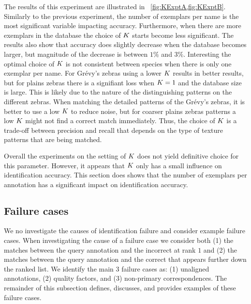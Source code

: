         The results of this experiment are illustrated in ~\cref{fig:KExptA,fig:KExptB}. Similarly to the previous
        experiment, the number of exemplars per name is the most significant variable impacting accuracy.
        Furthermore, when there are more exemplars in the database the choice of $K$ starts become less
        significant. The results also show that accuracy does slightly decrease when the database becomes larger,
        but magnitude of the decrease is between $1\percent$ and $3\percent$. Interesting the optimal choice of
        $K$ is not consistent between species when there is only one exemplar per name. For Grévy's zebras using a
        lower $K$ results in better results, but for plains zebras there is a signifiant loss when $K=1$ and the
        database size is large. This is likely due to the nature of the distinguishing patterns on the different
        zebras. When matching the detailed patterns of the Grévy's zebras, it is better to use a low $K$ to reduce
        noise, but for coarser plains zebras patterns a low $K$ might not find a correct match immediately. Thus,
        the choice of $K$ is a trade-off between precision and recall that depends on the type of texture patterns
        that are being matched.
        
        Overall the experiments on the setting of $K$ does not yield definitive choice for this parameter.
        However, it appears that $K$ only has a small influence on identification accuracy. This section does
        shows that the number of exemplars per annotation has a significant impact on identification accuracy.

        \KExptA{}
        \KExptB{}

    \FloatBarrier{}
    \subsection{Failure cases}\label{sub:exptfail}  
        
        We no investigate the causes of identification failure and consider example failure cases. When
        investigating the cause of a failure case we consider both (1) the matches between the query annotation and
        the incorrect \name{}  at rank $1$ and (2) the matches between the query annotation and the correct \name{}
        that appears further down the ranked list. We identify the main 3 failure cases as: (1) unaligned
        annotations, (2) quality factors, and (3) non-primary correspondences. The remainder of this subsection
        defines, discusses, and provides examples of these failure cases.

